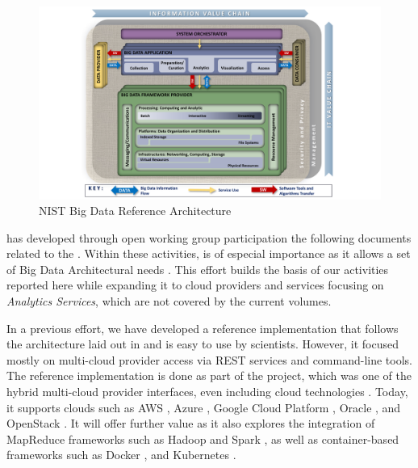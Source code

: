 \begin{figure}[htb]
\centering

\includegraphics[width=1.0\columnwidth]{images/NIST_RA_latest-crop.pdf}

\caption{NIST Big Data Reference Architecture \cite{nist-v8}}

\label{fig:bdra}
\end{figure}

 has developed through open working group participation the
following documents related to the
. Within
these activities,  is of especial importance as it allows a
set of Big Data Architectural needs
. This effort builds the basis of
our activities reported here while expanding it to cloud providers and
services focusing on {\em Analytics Services}, which are not covered
by the current volumes. 

In a previous effort, we have developed a reference implementation that follows the architecture laid out in  and is easy to use by scientists. 
However, it focused mostly on multi-cloud provider access via REST services and command-line tools. The reference implementation is done as part of the \Cloudmesh project, which was one of the  hybrid multi-cloud provider interfaces, even including cloud technologies . Today, it supports clouds such as AWS \cite{www-aws}, Azure \cite{www-azure}, Google Cloud Platform \cite{www-google}, Oracle \cite{www-oracle-cloud}, and OpenStack \cite{www-openStack}. It will offer further value as it also explores the integration of MapReduce frameworks such as Hadoop \cite{www-hadoop} and Spark \cite{www-spark}, as well as container-based frameworks such as Docker \cite{www-docker}, and Kubernetes \cite{www-kubernetes}. 

